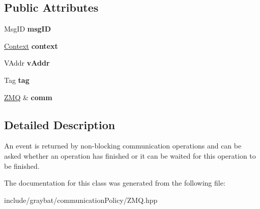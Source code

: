\subsection*{Public Attributes}
\begin{DoxyCompactItemize}
\item 
\hypertarget{classgraybat_1_1communicationPolicy_1_1ZMQ_1_1Event_aeb7c92f46b3df36ec9620d1b6fdcf23b}{}Msg\+I\+D {\bfseries msg\+I\+D}\label{classgraybat_1_1communicationPolicy_1_1ZMQ_1_1Event_aeb7c92f46b3df36ec9620d1b6fdcf23b}

\item 
\hypertarget{classgraybat_1_1communicationPolicy_1_1ZMQ_1_1Event_a6b6d250eb0f0b45e3f3b69b179fcfb1d}{}\hyperlink{classgraybat_1_1communicationPolicy_1_1ZMQ_1_1Context}{Context} {\bfseries context}\label{classgraybat_1_1communicationPolicy_1_1ZMQ_1_1Event_a6b6d250eb0f0b45e3f3b69b179fcfb1d}

\item 
\hypertarget{classgraybat_1_1communicationPolicy_1_1ZMQ_1_1Event_ac47201a239dfcebfb97ef92576b8f137}{}V\+Addr {\bfseries v\+Addr}\label{classgraybat_1_1communicationPolicy_1_1ZMQ_1_1Event_ac47201a239dfcebfb97ef92576b8f137}

\item 
\hypertarget{classgraybat_1_1communicationPolicy_1_1ZMQ_1_1Event_a68d5d4af93e96edbd20e89fa00ea8d35}{}Tag {\bfseries tag}\label{classgraybat_1_1communicationPolicy_1_1ZMQ_1_1Event_a68d5d4af93e96edbd20e89fa00ea8d35}

\item 
\hypertarget{classgraybat_1_1communicationPolicy_1_1ZMQ_1_1Event_a719aed4ae623dbc46ceb6fb844b969c3}{}\hyperlink{structgraybat_1_1communicationPolicy_1_1ZMQ}{Z\+M\+Q} \& {\bfseries comm}\label{classgraybat_1_1communicationPolicy_1_1ZMQ_1_1Event_a719aed4ae623dbc46ceb6fb844b969c3}

\end{DoxyCompactItemize}


\subsection{Detailed Description}
An event is returned by non-\/blocking communication operations and can be asked whether an operation has finished or it can be waited for this operation to be finished. 

The documentation for this class was generated from the following file\+:\begin{DoxyCompactItemize}
\item 
include/graybat/communication\+Policy/Z\+M\+Q.\+hpp\end{DoxyCompactItemize}
